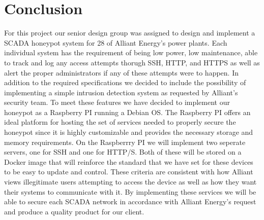 \chapter{Conclusion}

For this project our senior design group was assigned to design and implement a SCADA honeypot system for 28 of Alliant Energy's power plants.  Each individual system has the requirement of being low power, low maintenance, able to track and log any access attempts thorugh SSH, HTTP, and HTTPS as well as alert the proper administrators if any of these attempts were to happen.  In addition to the required specifications we decided to include the possibility of implementing a simple intrusion detection system as requested by Alliant's security team.  To meet these features we have decided to implement our honeypot as a Raspberry PI running a Debian OS.  The Raspberry PI offers an ideal platform for hosting the set of services needed to properly secure the honeypot since it is highly customizable and provides the necessary storage and memory requirements.  On the Raspberrry PI we will implement two seperate servers, one  for SSH and one for HTTP/S.  Both of these will be stored on a Docker image that will reinforce the standard that we have set for these devices to be easy to update and control. These criteria are consistent with how Alliant views illegitimate users attempting to access the device as well as how they want their systems to communicate with it.  By implementing these services we will be able to secure each SCADA network in accordance with Alliant Energy's request and produce a quality product for our client.
